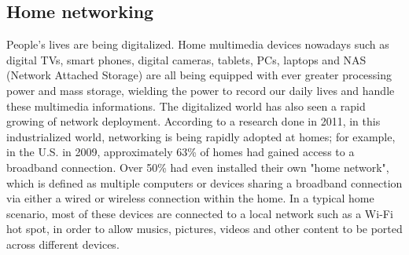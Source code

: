 
\subsection{Home networking}
People's lives are being digitalized. Home multimedia devices nowadays such as digital TVs,
smart phones, digital cameras, tablets, PCs, laptops and NAS (Network Attached
Storage) are all being equipped with ever greater processing power and mass storage, wielding the power  to
 record our daily lives and handle these multimedia informations. The digitalized world has also seen a rapid growing of network deployment. According to a research
\cite{stateofHN} done in 2011, in this industrialized world, networking
is being rapidly adopted at homes; for example, in the U.S. in 2009,
approximately 63\% of homes had gained access to a broadband connection. Over 50\% had even installed their own "home network", which is defined as multiple computers or devices sharing a broadband
 connection via either a wired or wireless connection within the home. In a typical
home scenario, most of these devices are connected to a local network such as a
Wi-Fi hot spot, in order to allow musics, pictures, videos and other content to
be ported across different devices.

